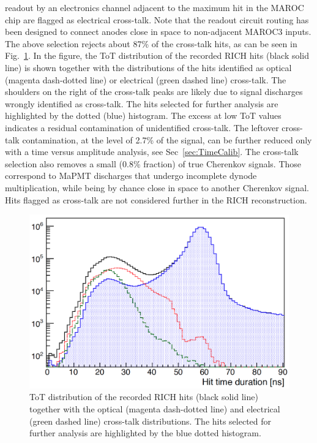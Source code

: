 \documentclass[5p,times,twocolumn]{elsarticle}
\begin{document}
readout by an electronics channel adjacent to the maximum hit in the MAROC chip are flagged as electrical
cross-talk. Note that the readout circuit routing has been designed to connect anodes close in space to non-adjacent
MAROC3 inputs. The above selection rejects about 87\% of the cross-talk hits, as can be seen in Fig.~\ref{Fig:Xtalk}.
In the figure, the ToT distribution of the recorded RICH hits (black solid line) is shown together with the
distributions of the hits identified as optical (magenta dash-dotted line) or electrical (green dashed line) cross-talk. The
shoulders on the right of the cross-talk peaks are likely due to signal discharges wrongly identified as cross-talk.
The hits selected for further analysis are highlighted by the dotted (blue) histogram. The excess at low ToT values
indicates a residual contamination of unidentified cross-talk. The leftover cross-talk contamination, at the level of
2.7\% of the signal, can be further reduced only with a time versus amplitude analysis, see Sec~\ref{sec:TimeCalib}.
The cross-talk selection also removes a small (0.8\% fraction) of true Cherenkov signals. Those correspond to MaPMT
discharges that undergo incomplete dynode multiplication, while being by chance close in space to another Cherenkov signal.
Hits flagged as cross-talk are not considered further in the RICH reconstruction.

\begin{figure}[t]
\begin{center}
\includegraphics[width=1.0\columnwidth]{xtalk.png}
\end{center}
\caption{ToT distribution of the recorded RICH hits (black solid line) together with the optical (magenta dash-dotted line)
  and electrical (green dashed line) cross-talk distributions.  The hits selected for further analysis are highlighted by the
  blue dotted histogram. }
\label{Fig:Xtalk}
\end{figure}
\end{document}
